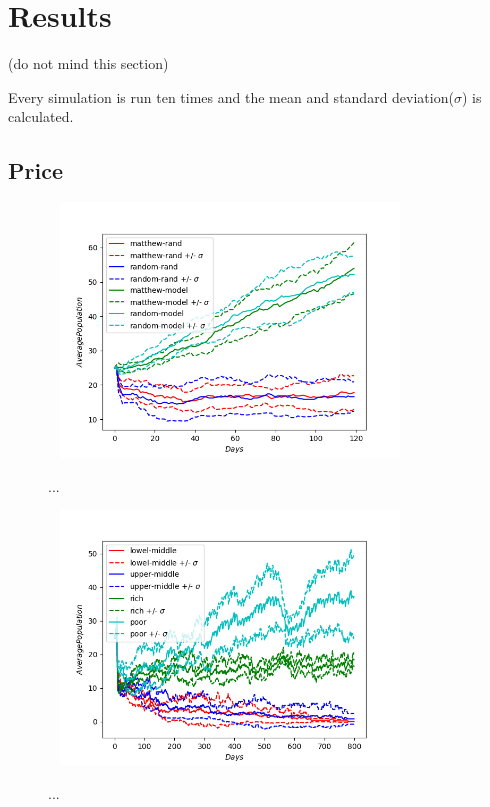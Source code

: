 \chapter{Results}

(do not mind this section)

Every simulation is run ten times and the mean and standard deviation($\sigma$) is calculated. 

\section{Price}

\begin{figure}[!htb]
	\hspace*{-1cm}\ 
	\centering
	\includegraphics[width=9cm]{images/histories_deviation.png}
	\caption{ ...
	}
	\label{fig:hist_dev}
	\hspace*{2mm} 
\end{figure}

\begin{figure}[!htb]
	\hspace*{-1cm}\ 
	\centering
	\includegraphics[width=9cm]{images/histories_deviation_fund.png}
	\caption{ ...
	}
	\label{fig:alloce}
	\hspace*{2mm} 
\end{figure}


